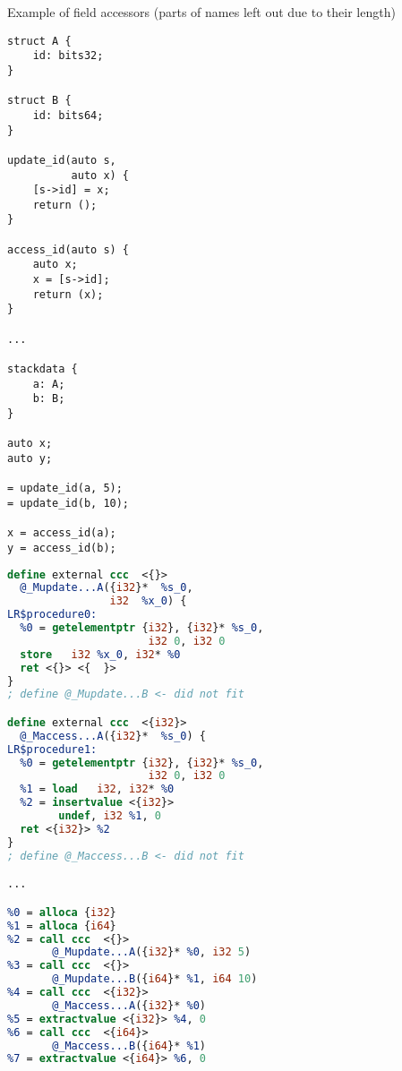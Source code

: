 \begin{listing}
    \small
    \caption{Example of field accessors (parts of names left out due to their length)}
    \label{lst:fieldAccessors}
    \begin{center}
    \begin{minipage}{0.35\linewidth}
    \begin{lstlisting}
struct A {
    id: bits32;
}

struct B {
    id: bits64;
}

update_id(auto s,
          auto x) {
    [s->id] = x;
    return ();
}

access_id(auto s) {
    auto x;
    x = [s->id];
    return (x);
}

...

stackdata {
    a: A;
    b: B;
}

auto x;
auto y;

= update_id(a, 5);
= update_id(b, 10);

x = access_id(a);
y = access_id(b);
    \end{lstlisting}
    \end{minipage}%
    \begin{minipage}{0.65\linewidth}
    \begin{lstlisting}[language=LLVM]
define external ccc  <{}>
  @_Mupdate...A({i32}*  %s_0,
                i32  %x_0) {
LR$procedure0:
  %0 = getelementptr {i32}, {i32}* %s_0,
                      i32 0, i32 0
  store   i32 %x_0, i32* %0
  ret <{}> <{  }>
}
; define @_Mupdate...B <- did not fit

define external ccc  <{i32}>
  @_Maccess...A({i32}*  %s_0) {
LR$procedure1:
  %0 = getelementptr {i32}, {i32}* %s_0,
                      i32 0, i32 0
  %1 = load   i32, i32* %0
  %2 = insertvalue <{i32}>
        undef, i32 %1, 0
  ret <{i32}> %2
}
; define @_Maccess...B <- did not fit

...

%0 = alloca {i32}
%1 = alloca {i64}
%2 = call ccc  <{}>
       @_Mupdate...A({i32}* %0, i32 5)
%3 = call ccc  <{}>
       @_Mupdate...B({i64}* %1, i64 10)
%4 = call ccc  <{i32}>
       @_Maccess...A({i32}* %0)
%5 = extractvalue <{i32}> %4, 0
%6 = call ccc  <{i64}>
       @_Maccess...B({i64}* %1)
%7 = extractvalue <{i64}> %6, 0

    \end{lstlisting}
    \end{minipage}
    \end{center}
\end{listing}

